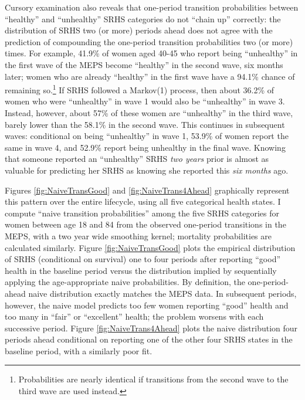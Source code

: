 \documentclass[12pt,pdftex,letterpaper]{article}
\begin{document}
Cursory examination also reveals that one-period transition probabilities between ``healthy'' and ``unhealthy'' SRHS categories do not ``chain up'' correctly: the distribution of SRHS two (or more) periods ahead does not agree with the prediction of compounding the one-period transition probabilities two (or more) times.  For example, 41.9\% of women aged 40-45 who report being ``unhealthy'' in the first wave of the MEPS become ``healthy'' in the second wave, six months later; women who are already ``healthy'' in the first wave have a 94.1\% chance of remaining so.\footnote{Probabilities are nearly identical if transitions from the second wave to the third wave are used instead.}  If SRHS followed a Markov(1) process, then about 36.2\% of women who were ``unhealthy'' in wave 1 would also be ``unhealthy'' in wave 3.  Instead, however, about 57\% of these women are ``unhealthy'' in the third wave, barely lower than the 58.1\% in the second wave.  This continues in subsequent waves: conditional on being ``unhealthy'' in wave 1, 53.9\% of women report the same in wave 4, and 52.9\% report being unhealthy in the final wave.  Knowing that someone reported an ``unhealthy'' SRHS \textit{two years} prior is almost as valuable for predicting her SRHS as knowing she reported this \textit{six months} ago.

Figures \ref{fig:NaiveTransGood} and \ref{fig:NaiveTrans4Ahead} graphically represent this pattern over the entire lifecycle, using all five categorical health states.  I compute ``naive transition probabilities'' among the five SRHS categories for women between age 18 and 84 from the observed one-period transitions in the MEPS, with a two year wide smoothing kernel; mortality probabilities are calculated similarly.  Figure \ref{fig:NaiveTransGood} plots the empirical distribution of SRHS (conditional on survival) one to four periods after reporting ``good'' health in the baseline period versus the distribution implied by sequentially applying the age-appropriate naive probabilities.  By definition, the one-period-ahead naive distribution exactly matches the MEPS data.  In subsequent periods, however, the naive model predicts too few women reporting ``good'' health and too many in ``fair'' or ``excellent'' health; the problem worsens with each successive period.  Figure \ref{fig:NaiveTrans4Ahead} plots the naive distribution four periods ahead conditional on reporting one of the other four SRHS states in the baseline period, with a similarly poor fit.
\end{document}
